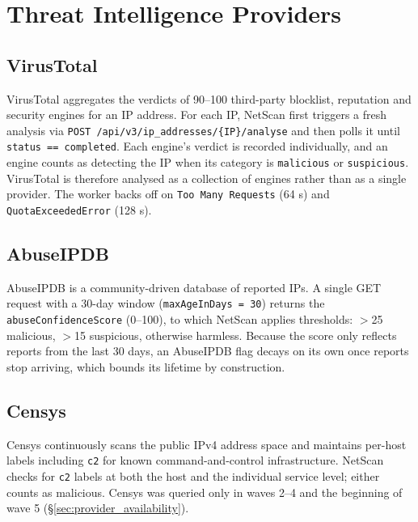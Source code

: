\chapter{Threat Intelligence Providers}
\label{ch:providers}

\section{VirusTotal}

VirusTotal aggregates the verdicts of 90--100 third-party blocklist, reputation and security
engines for an IP address. For each IP, NetScan first triggers a fresh analysis via
\texttt{POST /api/v3/ip\_addresses/\{IP\}/analyse} and then polls it until
\texttt{status == completed}. Each engine's verdict is recorded individually, and an engine counts as
detecting the IP when its category is \texttt{malicious} or \texttt{suspicious}. VirusTotal is
therefore analysed as a collection of engines rather than as a single provider. The worker backs off
on \texttt{Too Many Requests} (64 s) and \texttt{QuotaExceededError} (128 s).

\section{AbuseIPDB}

AbuseIPDB is a community-driven database of reported IPs. A single GET request with a 30-day window
(\texttt{maxAgeInDays = 30}) returns the \texttt{abuseConfidenceScore} (0--100), to which NetScan
applies thresholds: $>$25 malicious, $>$15 suspicious, otherwise harmless. Because the score only
reflects reports from the last 30 days, an AbuseIPDB flag decays on its own once reports stop
arriving, which bounds its lifetime by construction.

\section{Censys}

Censys continuously scans the public IPv4 address space and maintains per-host labels including
\texttt{c2} for known command-and-control infrastructure. NetScan checks for \texttt{c2} labels at
both the host and the individual service level; either counts as malicious. Censys was queried only
in waves 2--4 and the beginning of wave 5 (\S\ref{sec:provider_availability}).


